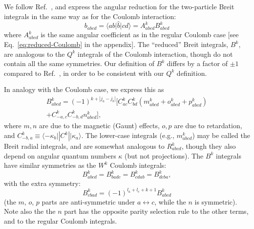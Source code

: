 \documentclass[10pt,twocolumn,a4paper]{article}%
\newcommand{\bra}[1]{\ensuremath{\langle #1|}}	%
\newcommand{\ket}[1]{\ensuremath{|#1\rangle}}
\newcommand{\be}{\begin{equation}}
\newcommand{\ee}{\end{equation}}
\renewcommand{\k}{\ensuremath{\kappa}}
\begin{document}

We follow Ref.~\cite{Mann1971}, and express the angular reduction for the two-particle Breit integrals in the same way as for the Coulomb interaction:
\[
b_{abcd} = \bra{ab}\hat b\ket{cd} = A^k_{abcd} B^k_{abcd}
\]
where $A^k_{abcd}$ is the same angular coefficient as in the regular Coulomb case [see Eq.~\eqref{eq:reduced-Coulomb} in the appendix].
The ``reduced'' Breit integrals, $B^k$, are analogous to the $Q^k$ integrals of the Coulomb interaction, though do not contain all the same symmetries.
Our definition of $B^k$ differs by a factor of $\pm1$ compared to Ref.~\cite{Mann1971}, in order to be consistent with our $Q^k$ definition.

In analogy with the Coulomb case, we express this as
\begin{multline}\label{eq:Bk-Breit}
    B^k_{abcd} = (-1)^{k+|j_a-j_b|}\Big[C^k_{ac}C^k_{bd}
    \left(m^k_{abcd}+o^k_{abcd}+p^k_{abcd}\right)\\
    +
    C^k_{-a,c}C^k_{-b,d}n^k_{abcd}\Big],
\end{multline}
where
$m,n$ are due to the magnetic (Gaunt) effects, $o,p$ are due to retardation, and $C^k_{-b,a} \equiv \bra{-\k_b}|C^k|\ket{\k_a}$. 
The lower-case integrals (e.g., $m^k_{abcd}$) may be called the Breit radial integrals, and are somewhat analogous to $R^k_{abcd}$, though they also depend on angular quantum numbers $\kappa$ (but not projections).
The $B^k$ integrals have similar symmetries as the $W^k$ Coulomb integrals:
\be
    B^k_{abcd} = B^k_{badc} = B^k_{cdab} = B^k_{dcba},
\ee
with the extra symmetry:
\be
    B^k_{cbad} = (-1)^{l_a+l_c+k+1}B^k_{abcd}
\ee
(the $m$, $o$, $p$ parts are anti-symmetric under $a\leftrightarrow c$, while the $n$ is symmetric).
Note also the the $n$ part has the opposite parity selection rule to the other terms, and to the regular Coulomb integrals.
\end{document}

